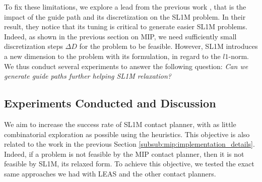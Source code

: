To fix these limitations, we explore a lead from the previous work \cite{sl1m_v2}, that is the impact of the guide path and its discretization on the SL1M problem.
In their result, they notice that its tuning is critical to generate easier SL1M problems.
Indeed, as shown in the previous section on MIP, we need sufficiently small discretization steps $\Delta D$ for the problem to be feasible. 
However, SL1M introduces a new dimension to the problem with its formulation, in regard to the $l1$-norm.
We thus conduct several experiments to answer the following question: \textit{Can we generate guide paths further helping SL1M relaxation?}


\subsection{Experiments Conducted and Discussion}

We aim to increase the success rate of SL1M contact planner, with as little combinatorial exploration as possible using the heuristics.
This objective is also related to the work in the previous Section \ref{subsub:mip:implementation_details}. 
Indeed, if a problem is not feasible by the MIP contact planner, then it is not feasible by SL1M, its relaxed form.
To achieve this objective, we tested the exact same approaches we had with LEAS and the other contact planners.

